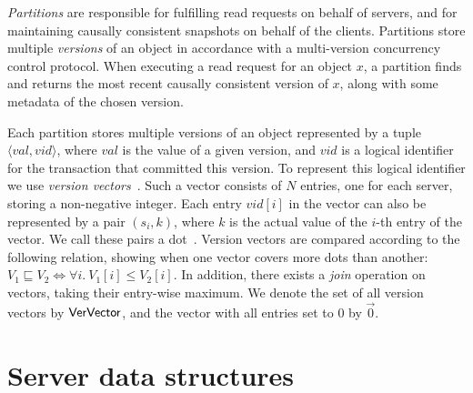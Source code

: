 \emph{Partitions} are responsible for fulfilling read requests on behalf of servers, and for maintaining causally consistent snapshots on behalf of the clients. Partitions store multiple \emph{versions} of an object in accordance with a multi-version concurrency control protocol. When executing a read request for an object $x$, a partition finds and returns the most recent causally consistent version of $x$, along with some metadata of the chosen version.

Each partition stores multiple versions of an object represented by a tuple $\langle val, vid \rangle$, where $val$ is the value of a given version, and $vid$ is a logical identifier for the transaction that committed this version. To represent this logical identifier we use \emph{version vectors}~\citep{version-vectors}. Such a vector consists of $N$ entries, one for each server, storing a non-negative integer. Each entry $vid[i]$ in the vector can also be represented by a pair $(s_i, k)$, where $k$ is the actual value of the $i$-th entry of the vector. We call these pairs a dot~\citep{carlos-causality}. Version vectors are compared according to the following relation, showing when one vector covers more dots than another: $V_1 \sqsubseteq V_2 \iff \forall i.\ V_1[i] \le V_2[i]$. In addition, there exists a \emph{join} operation on vectors, taking their entry-wise maximum.
We denote the set of all version vectors by $\mathsf{VerVector}$, and the vector with all entries set to $0$ by $\vec{0}$.

\section{Server data structures}
\label{sect:protocol_structures}

